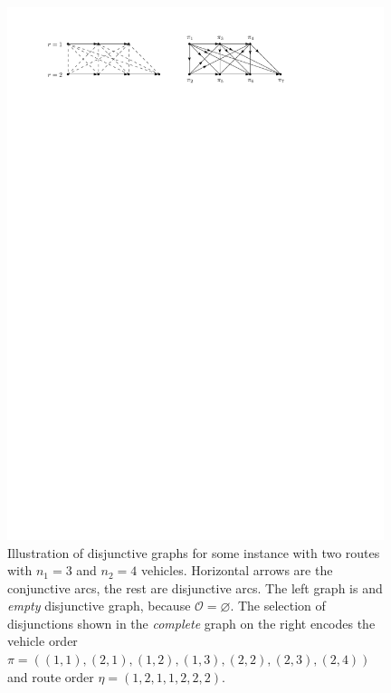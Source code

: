 \documentclass[a4paper]{article}
\theoremstyle{definition}
\theoremstyle{plain}
\begin{document}
\begin{figure}
  \centering
  \includegraphics[width=0.98\textwidth]{figures/single/disjunctive_graph.pdf}
  \caption{Illustration of disjunctive graphs for some instance with two routes
    with $n_{1} = 3$ and $n_{2} = 4$ vehicles. Horizontal arrows are the
    conjunctive arcs, the rest are disjunctive arcs. The left graph is and
    \textit{empty} disjunctive graph, because $\mathcal{O} = \varnothing$. The
    selection of disjunctions shown in the \textit{complete} graph on the right
    encodes the vehicle order
    $\pi = ((1,1), (2,1), (1,2), (1,3), (2,2), (2,3), (2,4))$ and route order
    $\eta = (1, 2, 1, 1, 2, 2, 2)$.}
  \label{fig:disjunctive_graphs}
\end{figure}
\end{document}
